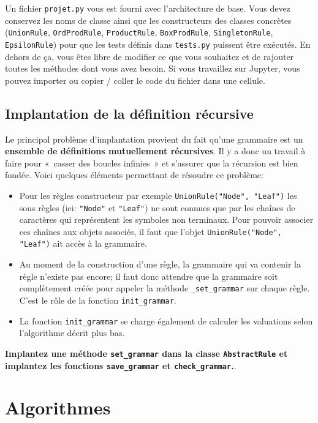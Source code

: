 \documentclass[11pt]{article}
\renewcommand{\emph}[1]{\textbf{#1}}
\newcommand{\EpsilonRule}{\texttt{EpsilonRule}\xspace}
\newcommand{\SingletonRule}{\texttt{SingletonRule}\xspace}
\newcommand{\UnionRule}{\texttt{UnionRule}\xspace}
\newcommand{\ProductRule}{\texttt{ProductRule}\xspace}
\newcommand{\BoxProdRule}{\texttt{BoxProdRule}\xspace}
\newcommand{\OrdProdRule}{\texttt{OrdProdRule}\xspace}
\begin{document}
Un fichier \texttt{projet.py} vous est fourni avec l'architecture de base. Vous
devez conservez les noms de classe ainsi que les constructeurs des classes
concrètes (\UnionRule, \OrdProdRule, \ProductRule, \BoxProdRule,
\SingletonRule, \EpsilonRule) pour que les tests définis dans \texttt{tests.py}
puissent être exécutés. En dehors de ça, vous êtes libre de modifier ce que
vous souhaitez et de rajouter toutes les méthodes dont vous avez besoin. Si
vous travaillez sur Jupyter, vous pouvez importer ou copier / coller le code
du fichier dans une cellule.

\subsection{Implantation de la définition récursive}

Le principal problème d'implantation provient du fait qu'une grammaire est un
\emph{ensemble de définitions mutuellement récursives}. Il y a donc un travail
à faire pour «~casser des boucles infinies~» et s'assurer que la récursion est
bien fondée. Voici quelques éléments permettant de résoudre ce problème:
\begin{itemize}
\item Pour les règles constructeur par exemple
  \verb+UnionRule("Node", "Leaf")+ les sous règles (ici: \verb+"Node"+ et
  \verb+"Leaf"+) ne sont connues que par les chaînes de caractères qui
  représentent les symboles non terminaux. Pour pouvoir associer ces chaînes
  aux objets associés, il faut que l'objet \verb+UnionRule("Node", "Leaf")+
  ait accès à la grammaire.
\item Au moment de la construction d'une règle, la grammaire qui va contenir
  la règle n'existe pas encore; il faut donc attendre que la grammaire soit
  complètement créée pour appeler la méthode \texttt{\_set\_grammar} sur
  chaque règle. C'est le rôle de la fonction \texttt{init\_grammar}.
\item La fonction \texttt{init\_grammar} se charge également de calculer les
  valuations selon l'algorithme décrit plus bas.
\end{itemize}
\medskip

\textbf{Implantez une méthode \texttt{set\_grammar} dans la classe \texttt{AbstractRule}
et implantez les fonctions \texttt{save\_grammar} et \texttt{check\_grammar}.}.


\section{Algorithmes}
\label{seq:algo}
\end{document}
